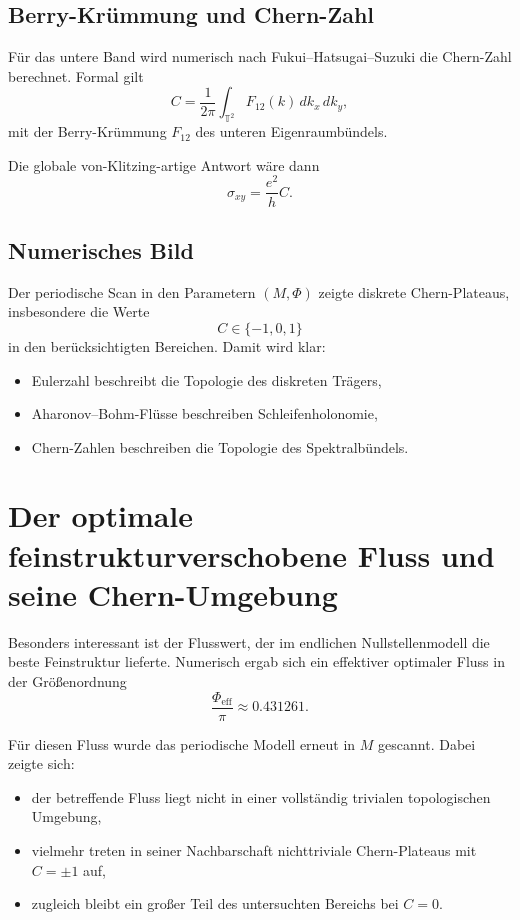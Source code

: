 \documentclass[11pt,a4paper]{article}
\theoremstyle{remark}
\newcommand{\T}{\mathbb{T}}
\begin{document}
	\subsection{Berry-Krümmung und Chern-Zahl}
	
	Für das untere Band wird numerisch nach Fukui--Hatsugai--Suzuki die Chern-Zahl berechnet. Formal gilt
	\begin{equation}
		C = \frac{1}{2\pi}\int_{\T^2} F_{12}(k)\,dk_x\,dk_y,
	\end{equation}
	mit der Berry-Krümmung $F_{12}$ des unteren Eigenraumbündels.
	
	Die globale von-Klitzing-artige Antwort wäre dann
	\begin{equation}
		\sigma_{xy}=\frac{e^2}{h}C.
	\end{equation}
	
	\subsection{Numerisches Bild}
	
	Der periodische Scan in den Parametern $(M,\Phi)$ zeigte diskrete Chern-Plateaus, insbesondere die Werte
	\begin{equation}
		C\in\{-1,0,1\}
	\end{equation}
	in den berücksichtigten Bereichen. Damit wird klar:
	\begin{itemize}
		\item Eulerzahl beschreibt die Topologie des diskreten Trägers,
		\item Aharonov--Bohm-Flüsse beschreiben Schleifenholonomie,
		\item Chern-Zahlen beschreiben die Topologie des Spektralbündels.
	\end{itemize}
	
	\section{Der optimale feinstrukturverschobene Fluss und seine Chern-Umgebung}
	
	Besonders interessant ist der Flusswert, der im endlichen Nullstellenmodell die beste Feinstruktur lieferte. Numerisch ergab sich ein effektiver optimaler Fluss in der Größenordnung
	\begin{equation}
		\frac{\Phi_{\mathrm{eff}}}{\pi}\approx 0.431261.
	\end{equation}
	
	Für diesen Fluss wurde das periodische Modell erneut in $M$ gescannt. Dabei zeigte sich:
	\begin{itemize}
		\item der betreffende Fluss liegt nicht in einer vollständig trivialen topologischen Umgebung,
		\item vielmehr treten in seiner Nachbarschaft nichttriviale Chern-Plateaus mit $C=\pm 1$ auf,
		\item zugleich bleibt ein großer Teil des untersuchten Bereichs bei $C=0$.
	\end{itemize}
	
\end{document}
